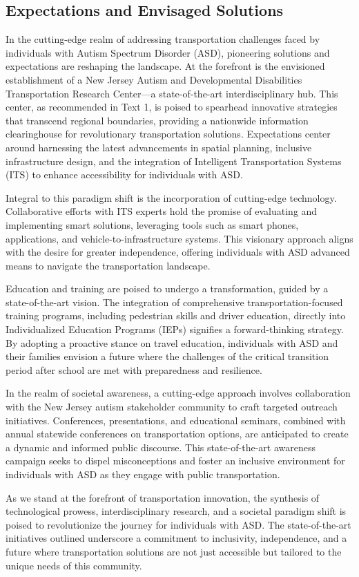 \subsection{Expectations and Envisaged Solutions}

    In the cutting-edge realm of addressing transportation challenges faced by individuals with Autism Spectrum Disorder (ASD), pioneering solutions and expectations are reshaping the landscape. At the forefront is the envisioned establishment of a New Jersey Autism and Developmental Disabilities Transportation Research Center—a state-of-the-art interdisciplinary hub. This center, as recommended in Text 1, is poised to spearhead innovative strategies that transcend regional boundaries, providing a nationwide information clearinghouse for revolutionary transportation solutions. Expectations center around harnessing the latest advancements in spatial planning, inclusive infrastructure design, and the integration of Intelligent Transportation Systems (ITS) to enhance accessibility for individuals with ASD.

    Integral to this paradigm shift is the incorporation of cutting-edge technology. Collaborative efforts with ITS experts hold the promise of evaluating and implementing smart solutions, leveraging tools such as smart phones, applications, and vehicle-to-infrastructure systems. This visionary approach aligns with the desire for greater independence, offering individuals with ASD advanced means to navigate the transportation landscape.
    
    Education and training are poised to undergo a transformation, guided by a state-of-the-art vision. The integration of comprehensive transportation-focused training programs, including pedestrian skills and driver education, directly into Individualized Education Programs (IEPs) signifies a forward-thinking strategy. By adopting a proactive stance on travel education, individuals with ASD and their families envision a future where the challenges of the critical transition period after school are met with preparedness and resilience.
    
    In the realm of societal awareness, a cutting-edge approach involves collaboration with the New Jersey autism stakeholder community to craft targeted outreach initiatives. Conferences, presentations, and educational seminars, combined with annual statewide conferences on transportation options, are anticipated to create a dynamic and informed public discourse. This state-of-the-art awareness campaign seeks to dispel misconceptions and foster an inclusive environment for individuals with ASD as they engage with public transportation.
    
    As we stand at the forefront of transportation innovation, the synthesis of technological prowess, interdisciplinary research, and a societal paradigm shift is poised to revolutionize the journey for individuals with ASD. The state-of-the-art initiatives outlined underscore a commitment to inclusivity, independence, and a future where transportation solutions are not just accessible but tailored to the unique needs of this community.